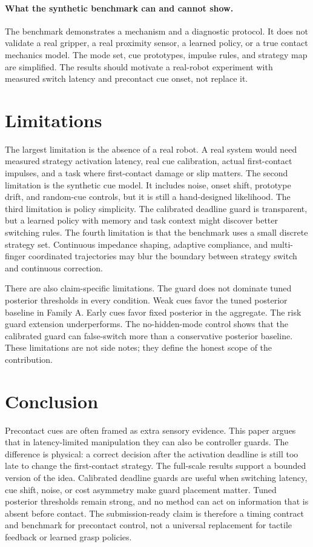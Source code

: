 \documentclass{article}
\begin{document}
\paragraph{What the synthetic benchmark can and cannot show.}
The benchmark demonstrates a mechanism and a diagnostic protocol. It does not validate a real gripper, a real proximity sensor, a learned policy, or a true contact mechanics model. The mode set, cue prototypes, impulse rules, and strategy map are simplified. The results should motivate a real-robot experiment with measured switch latency and precontact cue onset, not replace it.

\section{Limitations}

The largest limitation is the absence of a real robot. A real system would need measured strategy activation latency, real cue calibration, actual first-contact impulses, and a task where first-contact damage or slip matters. The second limitation is the synthetic cue model. It includes noise, onset shift, prototype drift, and random-cue controls, but it is still a hand-designed likelihood. The third limitation is policy simplicity. The calibrated deadline guard is transparent, but a learned policy with memory and task context might discover better switching rules. The fourth limitation is that the benchmark uses a small discrete strategy set. Continuous impedance shaping, adaptive compliance, and multi-finger coordinated trajectories may blur the boundary between strategy switch and continuous correction.

There are also claim-specific limitations. The guard does not dominate tuned posterior thresholds in every condition. Weak cues favor the tuned posterior baseline in Family A. Early cues favor fixed posterior in the aggregate. The risk guard extension underperforms. The no-hidden-mode control shows that the calibrated guard can false-switch more than a conservative posterior baseline. These limitations are not side notes; they define the honest scope of the contribution.

\section{Conclusion}

Precontact cues are often framed as extra sensory evidence. This paper argues that in latency-limited manipulation they can also be controller guards. The difference is physical: a correct decision after the activation deadline is still too late to change the first-contact strategy. The full-scale results support a bounded version of the idea. Calibrated deadline guards are useful when switching latency, cue shift, noise, or cost asymmetry make guard placement matter. Tuned posterior thresholds remain strong, and no method can act on information that is absent before contact. The submission-ready claim is therefore a timing contract and benchmark for precontact control, not a universal replacement for tactile feedback or learned grasp policies.
\end{document}
